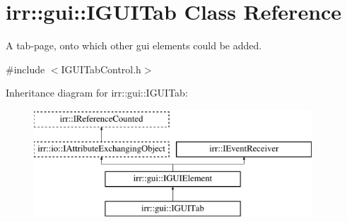 \hypertarget{classirr_1_1gui_1_1IGUITab}{}\section{irr\+:\+:gui\+:\+:I\+G\+U\+I\+Tab Class Reference}
\label{classirr_1_1gui_1_1IGUITab}


A tab-\/page, onto which other gui elements could be added.  




{\ttfamily \#include $<$I\+G\+U\+I\+Tab\+Control.\+h$>$}

Inheritance diagram for irr\+:\+:gui\+:\+:I\+G\+U\+I\+Tab\+:\begin{figure}[H]
\begin{center}
\leavevmode
\includegraphics[height=4.000000cm]{classirr_1_1gui_1_1IGUITab}
\end{center}
\end{figure}
